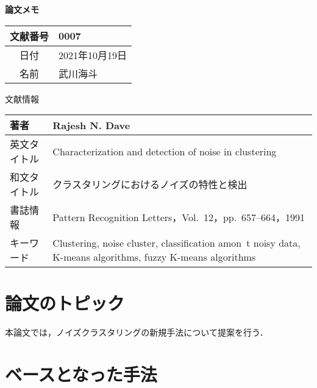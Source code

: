 \documentclass[10pt,onecolumn]{jsarticle}
\begin{document}
\vspace{-20mm}
\begin{center}
{\LARGE\textbf{論文メモ}}
\end{center}

\begin{flushright}
\begin{tabular}{|c|l|}
\hline
文献番号  &  0007
\\
\hline
日付  &  2021年10月19日
\\
\hline
名前  &  武川海斗
\\
\hline
\end{tabular}
\end{flushright}


%
%
\begin{center}
{\large 文献情報}
\begin{table}[hbp]%
\begin{tabular}{|l||l|}
\hline
著者  &  Rajesh N. Dave
\\ \hline
英文タイトル  & Characterization and detection of noise in clustering
\\ \hline
和文タイトル  & クラスタリングにおけるノイズの特性と検出
\\ \hline
書誌情報  &  Pattern Recognition Letters，Vol.~12，pp.~657--664，1991
\\ \hline
キーワード & Clustering, noise cluster, classification amon~t noisy data, K-means algorithms, fuzzy K-means algorithms
\\ \hline
\end{tabular}
\end{table}
\end{center}


\section{論文のトピック}
本論文では，ノイズクラスタリングの新規手法について提案を行う．
\section{ベースとなった手法}
\end{document}
